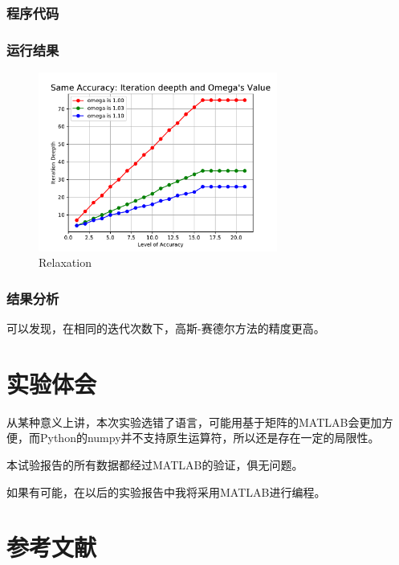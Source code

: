 \subsubsection{程序代码}



\subsubsection{运行结果}

\begin{figure}[H]   %
    \centering
    \includegraphics[width=0.7\textwidth]{../../img/04/relax.pdf}
    \caption{Relaxation}
    \label{Fig:relax}
\end{figure}

\subsubsection{结果分析}
可以发现，在相同的迭代次数下，高斯-赛德尔方法的精度更高。

\section{实验体会}

从某种意义上讲，本次实验选错了语言，可能用基于矩阵的MATLAB会更加方便，而Python的numpy并不支持原生运算符，所以还是存在一定的局限性。

本试验报告的所有数据都经过MATLAB的验证，俱无问题。

如果有可能，在以后的实验报告中我将采用MATLAB进行编程。


\section{参考文献}

\printbibliography[heading=none]


